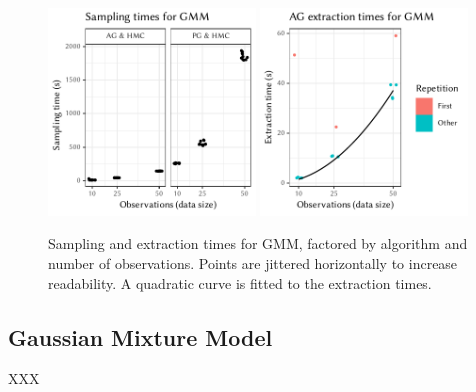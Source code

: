\newcommand{\leftplotcaption}[1]{%
  Sampling and extraction times for #1, factored by algorithm and number
  of observations.  Points are jittered horizontally to increase readability.  A quadratic curve is
  fitted to the extraction times.
}
\newcommand{\rightplotcaption}[1]{%
  Diagnostics, factored by algorithm, number of observations, and a selection of model parameters.
  \(\widehat{\mathrm{R}}\) and ESS point estimates are jittered horizontally for better readability.
  For chain plots and autocorrelation, the first chain of the respective combination has been used.
}

\begin{figure}[t!]
  \centering
  \includegraphics[width=0.49\textwidth]{figures/GMM-sampling_times}
  \includegraphics[width=0.49\textwidth]{figures/GMM-compile_times}
  \caption{\leftplotcaption{GMM}}
  \label{fig:plots-gmm}
\end{figure}

\subsection*{Gaussian Mixture Model}

XXX


\cleartorecto
\FloatBlock

